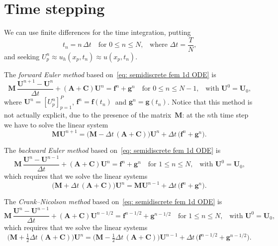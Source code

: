 \section{Time stepping}\label{sec: time stepping}
We can use finite differences for the time integration, putting
\[
t_n=n\,\Delta t\quad\text{for $0\le n\le N$,}
    \quad\text{where $\Delta t=\frac{T}{N}$,}
\]
and seeking $U^n_p\approx u_h(x_p,t_n)\approx u(x_p,t_n)$.

\begin{example}
The \emph{forward Euler method} based on~\eqref{eq: semidiscrete fem 1d ODE} is
\[
\boldsymbol{M}\,\frac{\boldsymbol{U}^{n+1}-\boldsymbol{U}^n}{\Delta t}
+(\boldsymbol{A}+\boldsymbol{C})\boldsymbol{U}^n=\boldsymbol{f}^n
    +\boldsymbol{g}^n\quad\text{for $0\le n\le N-1$,}
    \quad\text{with $\boldsymbol{U}^0=\boldsymbol{U}_0$,}
\]
where $\boldsymbol{U}^n=[U^n_p]_{p=1}^P$, 
$\boldsymbol{f}^n=\boldsymbol{f}(t_n)$~and 
$\boldsymbol{g}^n=\boldsymbol{g}(t_n)$.  Notice that this method is not 
actually explicit, due to the presence of the matrix~$\boldsymbol{M}$: at the 
$n$th time step we have to solve the linear system
\[
\boldsymbol{M}\boldsymbol{U}^{n+1}=\bigl(\boldsymbol{M}
-\Delta t\,(\boldsymbol{A}+\boldsymbol{C})\bigr)\boldsymbol{U}^n
    +\Delta t\,\bigl(\boldsymbol{f}^n+\boldsymbol{g}^n\bigr).
\]

\end{example}

\begin{example}
The \emph{backward Euler method} based on~\eqref{eq: semidiscrete fem 1d ODE} is
\[
\boldsymbol{M}\,\frac{\boldsymbol{U}^{n}-\boldsymbol{U}^{n-1}}{\Delta t}
+(\boldsymbol{A}+\boldsymbol{C})\boldsymbol{U}^n=\boldsymbol{f}^n
    +\boldsymbol{g}^n\quad\text{for $1\le n\le N$,}
    \quad\text{with $\boldsymbol{U}^0=\boldsymbol{U}_0$,}
\]
which requires that we solve the linear systems
\[
\bigl(\boldsymbol{M}+\Delta t\,(\boldsymbol{A}+\boldsymbol{C})\bigr) 
    \boldsymbol{U}^n=\boldsymbol{M}\boldsymbol{U}^{n-1}
    +\Delta t\,\bigl(\boldsymbol{f}^n+\boldsymbol{g}^n\bigr).
\]
\end{example}

\begin{example}
The \emph{Crank--Nicolson method} based on~\eqref{eq: semidiscrete fem 1d ODE} 
is
\[
\boldsymbol{M}\,\frac{\boldsymbol{U}^{n}-\boldsymbol{U}^{n-1}}{\Delta t}
+(\boldsymbol{A}+\boldsymbol{C})\boldsymbol{U}^{n-1/2}=\boldsymbol{f}^{n-1/2}
    +\boldsymbol{g}^{n-1/2}\quad\text{for $1\le n\le N$,}
    \quad\text{with $\boldsymbol{U}^0=\boldsymbol{U}_0$,}
\]
which requires that we solve the linear systems
\[
\bigl(\boldsymbol{M}+\tfrac12\Delta t\,(\boldsymbol{A}+\boldsymbol{C})\bigr) 
    \boldsymbol{U}^n
=\bigl(\boldsymbol{M}-\tfrac12\Delta t\,(\boldsymbol{A}+\boldsymbol{C})\bigr) 
    \boldsymbol{U}^{n-1}
    +\Delta t\,\bigl(\boldsymbol{f}^{n-1/2}+\boldsymbol{g}^{n-1/2}\bigr).
\]
\end{example}

